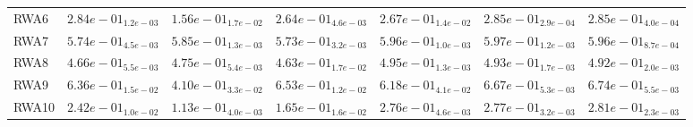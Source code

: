\documentclass{article}
\begin{document}
\begin{table}
\begin{scriptsize}
\begin{tabular}{lllllll}
RWA6 & $  2.84e-01_{ 1.2e-03}$ & $  1.56e-01_{ 1.7e-02}$ & $  2.64e-01_{ 4.6e-03}$ & $  2.67e-01_{ 1.4e-02}$ & \cellcolor{gray25}$  2.85e-01_{ 2.9e-04}$ & \cellcolor{gray95}$  2.85e-01_{ 4.0e-04}$ \\
RWA7 & $  5.74e-01_{ 4.5e-03}$ & $  5.85e-01_{ 1.3e-03}$ & $  5.73e-01_{ 3.2e-03}$ & $  5.96e-01_{ 1.0e-03}$ & \cellcolor{gray95}$  5.97e-01_{ 1.2e-03}$ & \cellcolor{gray25}$  5.96e-01_{ 8.7e-04}$ \\
RWA8 & $  4.66e-01_{ 5.5e-03}$ & $  4.75e-01_{ 5.4e-03}$ & $  4.63e-01_{ 1.7e-02}$ & \cellcolor{gray95}$  4.95e-01_{ 1.3e-03}$ & \cellcolor{gray25}$  4.93e-01_{ 1.7e-03}$ & $  4.92e-01_{ 2.0e-03}$ \\
RWA9 & $  6.36e-01_{ 1.5e-02}$ & $  4.10e-01_{ 3.3e-02}$ & $  6.53e-01_{ 1.2e-02}$ & $  6.18e-01_{ 4.1e-02}$ & \cellcolor{gray25}$  6.67e-01_{ 5.3e-03}$ & \cellcolor{gray95}$  6.74e-01_{ 5.5e-03}$ \\
RWA10 & $  2.42e-01_{ 1.0e-02}$ & $  1.13e-01_{ 4.0e-03}$ & $  1.65e-01_{ 1.6e-02}$ & $  2.76e-01_{ 4.6e-03}$ & \cellcolor{gray25}$  2.77e-01_{ 3.2e-03}$ & \cellcolor{gray95}$  2.81e-01_{ 2.3e-03}$ \\
\hline
\end{tabular}
\end{scriptsize}
\end{table}
\end{document}
